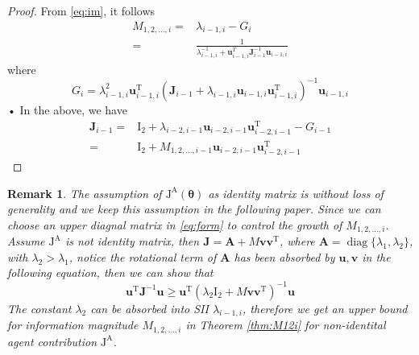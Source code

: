 \documentclass[conference]{IEEEtran}
\newtheorem{remark}{Remark}
\DeclareMathOperator\diag{diag}
\newif\ifshowdetail
\begin{document}
\begin{proof}
From \eqref{eq:im}, it follows
\begin{align}
M_{1,2,\dots,i}=& \lambda_{i-1,i}-G_i\nonumber\\
=&\frac{1}{\lambda_{i-1,i}^{-1}+\bm{u}_{i-1,i}^T \bm{J}_{i-1}^{-1} \bm{u}_{i-1,i}}
\end{align}
where
\begin{equation*}
G_i=\lambda_{i-1,i}^2 \bm{u}_{i-1,i}^{\mathrm{T}}(\bm{J}_{i-1}+\lambda_{i-1,i}\bm{u}_{i-1,i}\bm{u}_{i-1,i}^{\mathrm{T}})^{-1}\bm{u}_{i-1,i}
\end{equation*}•
In the above, we have
\begin{align}\label{eq:form}
\bm{J}_{i-1}=&\bm{\mathrm{I}}_2+\lambda_{i-2,i-1}\bm{u}_{i-2,i-1}\bm{u}_{i-2,i-1}^{\mathrm{T}}-G_{i-1}\nonumber\\
=&\bm{\mathrm{I}}_2+M_{1,2,\dots,i-1}\bm{u}_{i-2,i-1}\bm{u}_{i-2,i-1}^{\mathrm{T}}
\end{align}
\end{proof}
\begin{remark}
The assumption of $\bm{\mathrm{J}}^\mathrm{A}(\bm{\theta})$ as identity matrix is without loss of generality and we keep this assumption in the following paper. Since we can choose an upper diagnal matrix
in \eqref{eq:form} to control the growth of $M_{1,2,\dots,i}$. Assume $\bm{\mathrm{J}}^\mathrm{A}$ is not identity matrix, then $\bm{J}=\bm{A}+M\bm{v}\bm{v}^{\mathrm{T}}$, where 
$\bm{A}=\diag\{\lambda_1,\lambda_2\}$, with $\lambda_2>\lambda_1$, notice the rotational term of $\bm{A}$ has been absorbed by $\bm{u},\bm{v}$ in the following equation, 
then we can show that
\begin{equation}\label{eq:nonIdentity}
\bm{u}^{\mathrm{T}}\bm{J}^{-1}\bm{u}\geq \bm{u}^{\mathrm{T}}(\lambda_2\bm{\mathrm{I}}_2+M\bm{v}\bm{v}^{\mathrm{T}})^{-1}\bm{u}
\end{equation}
The constant $\lambda_2$ can be absorbed into SII $\lambda_{i-1,i}$, therefore we get an upper bound for information magnitude
$M_{1,2,\dots,i}$ in Theorem \ref{thm:M12i} for non-identital agent contribution $\bm{\mathrm{J}}^\mathrm{A}$.
\ifshowdetail
The equation \eqref{eq:nonIdentity} can be shown as follows:
We write $\bm{A}_1=\bm{J}$ and $\bm{A}_2=\lambda_2\bm{\mathrm{I}}_2+M\bm{v}\bm{v}^{\mathrm{T}}$ and we have:
\begin{equation*}
\bm{A}_1=\bm{A}_2+\diag\{\lambda_1-\lambda_2,0\}
\end{equation*}
Then 
\begin{equation*}
\bm{u}^{\mathrm{T}}(\bm{A}^{-1}_1-\bm{A}^{-1}_2)\bm{u} = \mu_1\mu_2
\end{equation*}
where
\begin{align*}
\mu_1 = & (\bm{A}_2^{-1}\bm{u})^\mathrm{T}\diag\{1,0\}(\bm{A}_2^{-1}\bm{u})\\
\frac{1}{\mu_2} = & \left((\lambda_2-\lambda_1)^{-1}-(1,0)\bm{A}_2^{-1}\binom{1}{0}\right)
\end{align*}
It can be shown that both $\mu_1$ and $\mu_2$ are greater than zero and the validity of equation \eqref{eq:nonIdentity} is established.
\fi
\end{remark}
\end{document}
